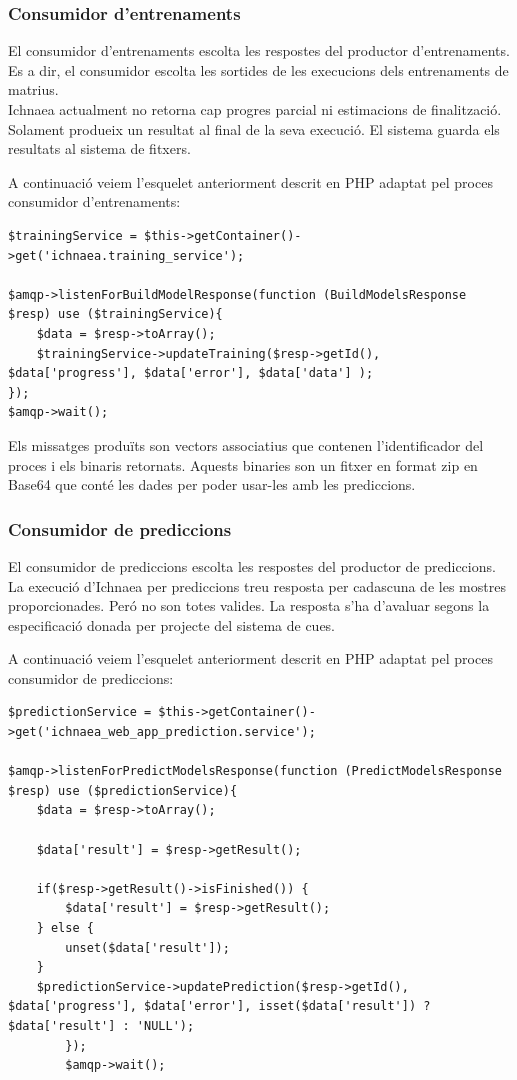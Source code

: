 \subsubsection{Consumidor d'entrenaments}
El consumidor d'entrenaments escolta les respostes del productor d'entrenaments. Es a dir, el consumidor escolta les sortides de les execucions dels entrenaments de matrius.\\

Ichnaea actualment no retorna cap progres parcial ni estimacions de finalitzaci\'{o}. Solament produeix un resultat al final de la seva execució. El sistema guarda els resultats al sistema de fitxers.

A continuació veiem l'esquelet anteriorment descrit en PHP adaptat pel proces consumidor d'entrenaments:

\begin{lstlisting}
$trainingService = $this->getContainer()->get('ichnaea.training_service');
		
$amqp->listenForBuildModelResponse(function (BuildModelsResponse $resp) use ($trainingService){
	$data = $resp->toArray();
	$trainingService->updateTraining($resp->getId(), $data['progress'], $data['error'], $data['data'] );
});
$amqp->wait();
\end{lstlisting}

Els missatges produïts son vectors associatius que contenen l'identificador del proces i els binaris retornats. Aquests binaries son un fitxer en format zip en Base64 que cont\'{e} les dades per poder usar-les amb les prediccions.

\subsubsection{Consumidor de prediccions}
El consumidor de prediccions escolta les respostes del productor de prediccions.\\

La execució d'Ichnaea per prediccions treu resposta per cadascuna de les mostres proporcionades. Peró no son totes valides. La resposta s'ha d'avaluar segons la especificació donada per projecte del sistema de cues. 

A continuació veiem l'esquelet anteriorment descrit en PHP adaptat pel proces consumidor de prediccions:

\begin{lstlisting}
$predictionService = $this->getContainer()->get('ichnaea_web_app_prediction.service');
		
$amqp->listenForPredictModelsResponse(function (PredictModelsResponse $resp) use ($predictionService){
	$data = $resp->toArray();
	
	$data['result'] = $resp->getResult();

	if($resp->getResult()->isFinished()) {
 		$data['result'] = $resp->getResult();
	} else {
		unset($data['result']);
	}
	$predictionService->updatePrediction($resp->getId(), $data['progress'], $data['error'], isset($data['result']) ? $data['result'] : 'NULL');
		});
		$amqp->wait();
\end{lstlisting}

